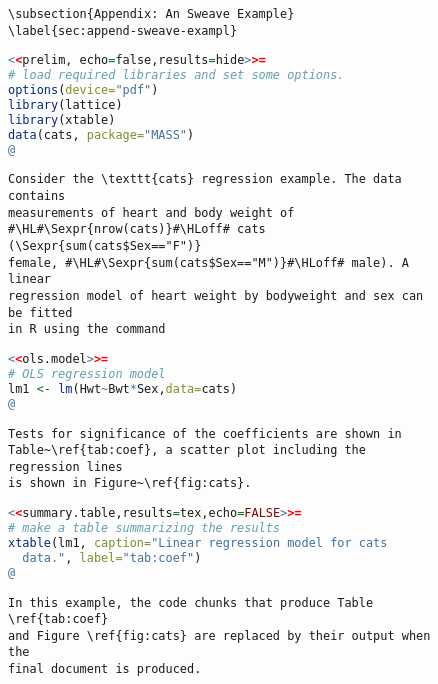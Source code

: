 \documentclass[11pt]{article}
\begin{document}
\begin{figure}
\begin{lstlisting}[style=sweave-top]

\end{lstlisting} 
\begin{lstlisting}[language={[latex]tex},numbers=none,style=sweave-tex]   
\subsection{Appendix: An Sweave Example}
\label{sec:append-sweave-exampl}
\end{lstlisting}
\begin{lstlisting}[language=R,numbers=none,style=sweave-r] 
<<prelim, echo=false,results=hide>>=
# load required libraries and set some options.
options(device="pdf")
library(lattice)
library(xtable)
data(cats, package="MASS")
@ 
\end{lstlisting}

\begin{lstlisting}[language={[latex]tex},numbers=none,style=sweave-tex] 
Consider the \texttt{cats} regression example. The data contains
measurements of heart and body weight of
#\HL#\Sexpr{nrow(cats)}#\HLoff# cats (\Sexpr{sum(cats$Sex=="F")}
female, #\HL#\Sexpr{sum(cats$Sex=="M")}#\HLoff# male). A linear
regression model of heart weight by bodyweight and sex can be fitted
in R using the command
\end{lstlisting} 
\begin{lstlisting}[language=R,numbers=none,style=sweave-r]
<<ols.model>>= 
# OLS regression model 
lm1 <- lm(Hwt~Bwt*Sex,data=cats) 
@
\end{lstlisting}
\begin{lstlisting}[language={[latex]tex},numbers=none,style=sweave-tex]
Tests for significance of the coefficients are shown in
Table~\ref{tab:coef}, a scatter plot including the regression lines 
is shown in Figure~\ref{fig:cats}.
\end{lstlisting}

\begin{lstlisting}[language=R,numbers=none,style=sweave-r]
<<summary.table,results=tex,echo=FALSE>>= 
# make a table summarizing the results 
xtable(lm1, caption="Linear regression model for cats
  data.", label="tab:coef") 
@
\end{lstlisting}
\begin{lstlisting}[language={[latex]tex},numbers=none,style=sweave-tex]
In this example, the code chunks that produce Table \ref{tab:coef} 
and Figure \ref{fig:cats} are replaced by their output when the 
final document is produced.


\end{lstlisting}
\end{figure}
\end{document}

